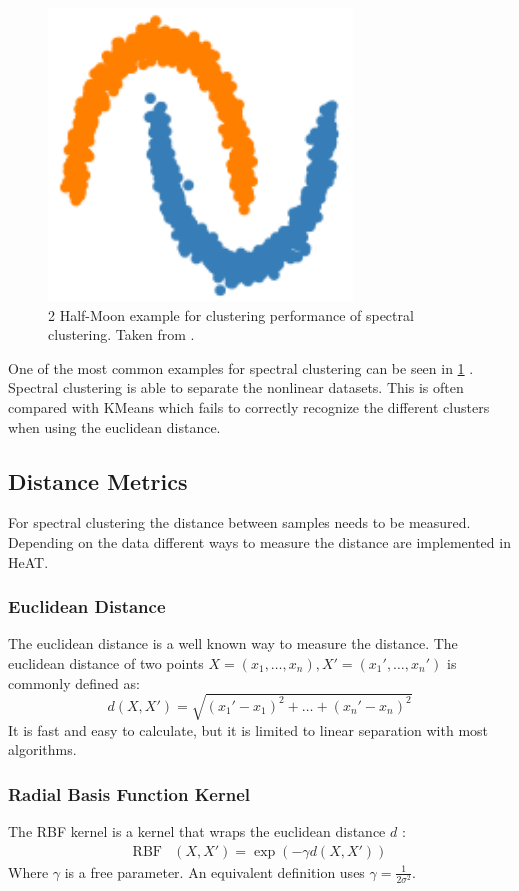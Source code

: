 \begin{figure}
  \includegraphics{images/spectral_example.png}
  \caption{2 Half-Moon example for clustering performance of spectral clustering. Taken from \cite{noauthor_23_2020}.}
  \label{fig:spectral_example}
\end{figure}

One of the most common examples for spectral clustering can be seen in \cref{fig:spectral_example} \cite{noauthor_23_2020}. Spectral clustering is able to
separate the nonlinear datasets. This is often compared with KMeans which fails to correctly recognize the different clusters when using the euclidean distance.

\subsection{Distance Metrics}
\label{subsec:distance_metrics}
For spectral clustering the distance between samples needs to be measured. Depending on the data different ways to measure the distance are implemented in \gls{HeAT}.

\subsubsection{Euclidean Distance}
The euclidean distance is a well known way to measure the distance. The euclidean distance of two points \(X = (x_1, \ldots, x_n ), X' = (x_1', \ldots, x_n')\) is commonly defined  as:
\[
  d\left(X, X'\right) = \sqrt{{(x_1' - x_1)}^2 + \ldots + {(x_n' - x_n)}^2}
\]
It is fast and easy to calculate, but it is limited to  linear separation with most algorithms.

\subsubsection{Radial Basis Function Kernel}
The RBF kernel is a kernel that wraps the euclidean distance \(d\) \cite{vert_primer_2004}:
\begin{align*}
  \mathop{RBF} & \left(X, X'\right) = \exp(-\gamma d(X, X'))
\end{align*}
Where \(\gamma\) is a free parameter. An equivalent definition uses \(\gamma = \frac{1}{2\sigma^2}\).


